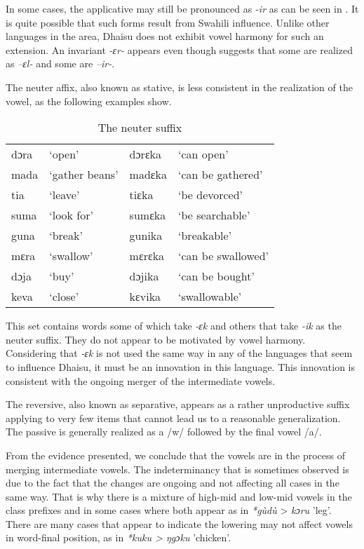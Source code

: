 \documentclass[output=paper,colorlinks,citecolor=brown]{langscibook}
\begin{document}
In some cases, the applicative may still be pronounced as \textit{-ir} as can be seen in \cite[25]{RugemaliraEtAl2019}. It is quite possible that such forms result from Swahili influence. Unlike other languages in the area, Dhaisu does not exhibit vowel harmony for such an extension. An invariant \textit{-ɛr-} appears even though \cite[40]{Nurse2000} suggests that some are realized as \textit{–ɛl-} and some are \textit{–ir-}. 

The neuter affix, also known as stative, is less consistent in the realization of the vowel, as the following examples show.

\begin{table}
    \caption{The neuter suffix}
    \label{tab:ngonyani:16}
    \begin{tabular}{@{}l l l l@{}}
        dɔra & `open' & dɔrɛka & `can open'  \\
         mada & `gather beans' & madɛka & `can be gathered'\\
         tia & `leave' & tiɛka & `be devorced'\\
         suma & `look for' & sumɛka & `be searchable'\\
         guna & `break' & gunika & `breakable'\\
         mɛra & `swallow' & mɛrɛka & `can be swallowed'\\
         dɔja & `buy' & dɔjika & `can be bought'\\
         keva & `close' & kɛvika & `swallowable'
    \end{tabular}
\end{table}

This set contains words some of which take \textit{-ɛk }and others that take \textit{-ik} as the neuter suffix. They do not appear to be motivated by vowel harmony. Considering that \textit{-ɛk} is not used the same way in any of the languages that seem to influence Dhaisu, it must be an innovation in this language. This innovation is consistent with the ongoing merger of the intermediate vowels.

The reversive, also known as separative, appears as a rather unproductive suffix applying to very few items that cannot lead us to a reasonable generalization. The passive is generally realized as a /w/ followed by the final vowel /a/.

From the evidence presented, we conclude that the vowels are in the process of merging intermediate vowels. The indeterminancy that is sometimes observed is due to the fact that the changes are ongoing and not affecting all cases in the same way. That is why there is a mixture of high-mid and low-mid vowels in the class prefixes and in some cases where both appear as in \textit{*gùdù} > \textit{kɔru} 'leg'. There are many cases that appear to indicate the lowering may not affect vowels in word-final position, as in \textit{*kuku >  ŋgɔku} 'chicken'.
\end{document}
